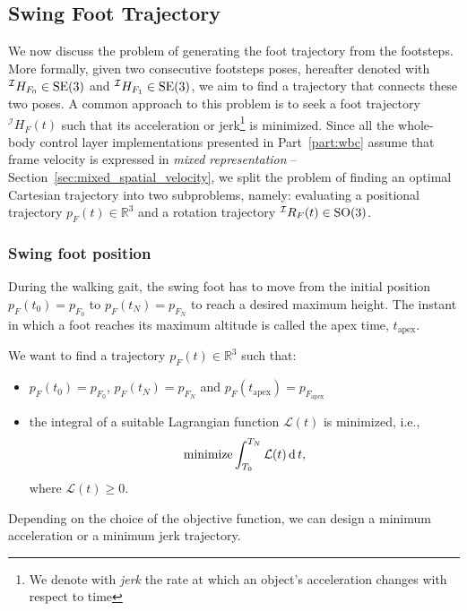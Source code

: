 \subsection{Swing Foot Trajectory \label{sec:swing_foot_trajectory}}
We now discuss the problem of generating the foot trajectory from the footsteps. More formally, given two consecutive footsteps poses, hereafter denoted with ${}^\mathcal{I} H _{F_0} \in {\mathrm{SE}}(3)$ and ${}^\mathcal{I} H _{F_1} \in {\mathrm{SE}}(3)$, we aim to find a trajectory that connects these two poses. A common approach to this problem is to seek a foot trajectory ${}^\mathcal{I} H _{F}(t)$ such that its acceleration or jerk\footnote{We denote with \emph{jerk} the rate at which an object's acceleration changes with respect to time} is minimized. Since all the whole-body control layer implementations presented in Part~\ref{part:wbc} assume that frame velocity is expressed in \emph{mixed representation} -- Section~\ref{sec:mixed_spatial_velocity}, we split the problem of finding an optimal Cartesian trajectory into two subproblems, namely: evaluating a positional trajectory $p_F(t) \in \mathbb{R}^3$ and a rotation trajectory ${}^\mathcal{I} R _ F (t) \in \mathrm{SO}(3)$.

\subsubsection{Swing foot position}
During the walking gait, the swing foot has to move from the initial position $p_F(t_0) = p_{F_0}$ to $p_F(t_N) = p_{F_N}$ to reach a desired maximum
height. The instant in which a foot reaches its maximum altitude is called the apex time, $t_\text{apex}$.
\par
We want to find a trajectory $p_F(t) \in \mathbb{R}^3$ such that:
\begin{itemize}
    \item $p_F(t_0) = p_{F_0}$, $p_F(t_N) = p_{F_N}$ and $p_F(t_\text{apex}) = p_{F_\text{apex}}$
    \item the integral of a suitable Lagrangian function $\mathcal{L}(t)$ is minimized, i.e., 
    \begin{equation}
        \label{eq:foot_position_minimization_general}
        \operatorname*{minimize} \int_{T_{0}}^{T_{N}} \mathcal{L}(t) \operatorname{d} t,
    \end{equation}
    where $\mathcal{L}(t) \ge 0$.
\end{itemize}
Depending on the choice of the objective function, we can design a minimum acceleration or a minimum jerk trajectory.
